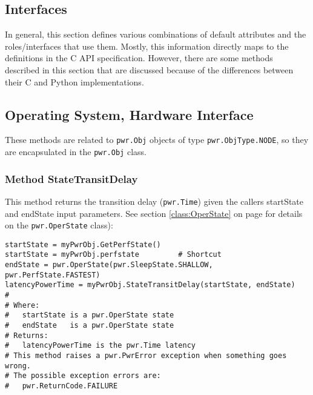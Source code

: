 \documentclass[12pt]{report} %
\begin{document}
\begin{appendices}
\section{Interfaces}\label{sec:PythonInterfaces}
In general, this section defines various combinations of default attributes and
the roles/interfaces that use them. Mostly, this information directly
maps to the definitions in the C API specification. However, there are some
methods described in this section that are discussed because of the
differences between their C and Python implementations.

\subsection{Operating System, Hardware Interface}
\label{sec:PythonOperatingSystemInterface}

These methods are related to \texttt{pwr.Obj} objects of type
\texttt{pwr.ObjType.NODE}, so they are encapsulated in the \texttt{pwr.Obj}
class.

\subsubsection{Method StateTransitDelay} \label{meth:StateTransitDelay}

This method returns the transition delay (\texttt{pwr.Time}) given the callers startState
and endState input parameters. See section \ref{class:OperState} on page
\pageref{class:OperState} for details on the \texttt{pwr.OperState} class): 

\begin{center}\begin{minipage}{.95\linewidth}\begin{lstlisting}
startState = myPwrObj.GetPerfState()
startState = myPwrObj.perfstate         # Shortcut
endState = pwr.OperState(pwr.SleepState.SHALLOW, pwr.PerfState.FASTEST)
latencyPowerTime = myPwrObj.StateTransitDelay(startState, endState)
#
# Where:
#   startState is a pwr.OperState state 
#   endState   is a pwr.OperState state
# Returns:
#   latencyPowerTime is the pwr.Time latency
# This method raises a pwr.PwrError exception when something goes wrong.
# The possible exception errors are: 
#   pwr.ReturnCode.FAILURE
\end{lstlisting}\end{minipage}\end{center}


\end{appendices}
\end{document}
